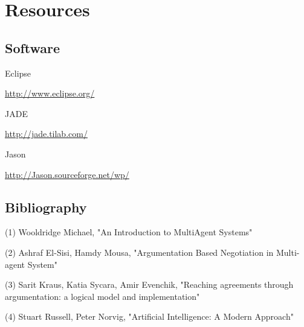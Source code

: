 \documentclass{article}
\begin{document}
\section{Resources}

\subsection{Software}
Eclipse \par
\url{http://www.eclipse.org/} \par
\vspace{3mm}
JADE \par
\url{http://jade.tilab.com/} \par 
\vspace{3mm}
Jason \par
\url{http://Jason.sourceforge.net/wp/} \par 

\subsection{Bibliography}
\noindent
(1) Wooldridge Michael, "An Introduction to MultiAgent Systems"

\noindent
(2) Ashraf El-Sisi, Hamdy Mousa, "Argumentation Based Negotiation in Multi-agent System"

\noindent
(3) Sarit Kraus, Katia Sycara, Amir Evenchik, "Reaching agreements through argumentation: a logical model and implementation"

\noindent
(4) Stuart Russell, Peter Norvig, "Artificial Intelligence: A Modern Approach"
\end{document}
